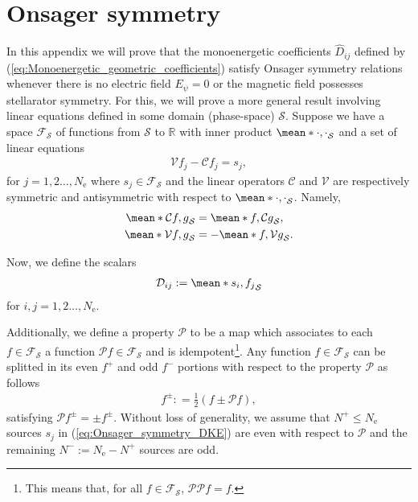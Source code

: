 \section{Onsager symmetry}
\label{sec:Appendix_Onsager_symmetry}
In this appendix we will prove that the monoenergetic coefficients $\widehat{D}_{ij}$ defined by (\ref{eq:Monoenergetic_geometric_coefficients}) satisfy Onsager symmetry relations whenever there is no electric field $E_\psi=0$ or the magnetic field possesses stellarator symmetry. For this, we will prove a more general result involving linear equations defined in some domain (phase-space) $\mathcal{S}$. Suppose we have a space $\mathcal{F_S}$ of functions from $\mathcal{S}$ to $\mathbb{R}$ with inner product $\mean*{\cdot,\cdot}_{\mathcal{S}}$ and a set of linear equations
%
\begin{align}
	\mathcal{V} f_j - \mathcal{C}f_j = s_j,
	\label{eq:Onsager_symmetry_DKE}
\end{align}
for $j=1,2\ldots, N_{\text{e}} $ where $s_j\in\mathcal{F_S}$ and the linear operators $\mathcal{C}$ and $\mathcal{V}$ are respectively symmetric and antisymmetric with respect to $\mean*{\cdot,\cdot}_{\mathcal{S}}$. Namely,
%
\begin{align}
	\mean*{\mathcal{C}f,g}_{\mathcal{S}} & = \mean*{f,\mathcal{C}g}_{\mathcal{S}}, 
	\label{eq:Onsager_symmetry_Collision_Symmetry}\\
	\mean*{\mathcal{V}f,g}_{\mathcal{S}} & = -\mean*{f,\mathcal{V}g}_{\mathcal{S}}.
	\label{eq:Onsager_symmetry_Vlasov_Skew_Symmetry}
\end{align}



Now, we define the scalars 
%
\begin{align}
	\mathcal{D}_{ij} := \mean*{ s_i, f_j}_{\mathcal{S}}
	\label{eq:Onsager_symmetry_coefficients}
\end{align}
for $i,j=1,2\ldots, N_{\text{e}} $.

Additionally, we define a property $\mathcal{P}$ to be a map which associates to each $f\in\mathcal{F_S}$ a function $\mathcal{P} f \in\mathcal{F_S}$ and is idempotent\footnote{This means that, for all $f\in\mathcal{F_S}$, $\mathcal{P} \mathcal{P} f=f$.}. Any function $f\in\mathcal{F_S}$ can be splitted in its even $f^+$ and odd $f^-$ portions with respect to the property $\mathcal{P}$ as follows
%
\begin{align}
	f^\pm : = 
	\frac{1}{2}
	\left(
	f \pm \mathcal{P} f
	\right),
\end{align}
satisfying $\mathcal{P} f^\pm = \pm f^\pm$. Without loss of generality, we assume that $N^+\le N_{\text{e}}$ sources $s_j$ in (\ref{eq:Onsager_symmetry_DKE}) are even with respect to $\mathcal{P}$ and the remaining $N^- := N_{\text{e}}- N^+$ sources are odd. 

